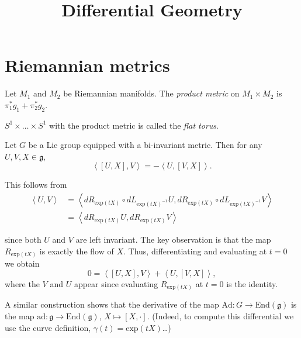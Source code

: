 



\title{Differential Geometry}
\maketitle

\label{section-phantom}
\tableofcontents

\section{Riemannian metrics}
\label{section-Riemannian-metrics}

\begin{definition}
\label{definition-product-metric}
Let $M_1$ and $M_2$ be Riemannian manifolds.
The {\it product metric} on
$M_1\times M_2$ is $\pi_1^*g_1+\pi_2^*g_2$.
\end{definition}

\begin{definition}
\label{definition-flat-torus}
$S^1\times\ldots\times S^1$ with the product
metric is called the {\it flat
torus}.
\end{definition}

\medskip\noindent
Let $G$ be a Lie group equipped with a
bi-invariant metric.
Then for any $U,V,X \in \mathfrak{g}$,
\begin{equation}
\label{equation-lie-group-bi-invar-metri}
\left\langle{}[U,X],V\right\rangle{}=-\left\langle{}U,[V,X]\right\rangle{}.
\end{equation}

\noindent
This follows from
$$
\begin{aligned}
\left\langle{}U,V\right\rangle{}&=
\left\langle{}dR_{\text{exp}(tX)}\circ
dL_{\text{exp}(tX)^{-1}}U,
dR_{\text{exp}(tX)}\circ
dL_{\text{exp}(tX)^{-1}}V\right\rangle{}\\
&=\left\langle{}dR_{\text{exp}(tX)}U,
dR_{\text{exp}(tX)}V\right\rangle{}
\end{aligned}
$$

\noindent
since both $U$ and $V$ are left invariant.
The key observation is that the map
$R_{\text{exp}(tX)}$
is exactly the flow of $X$.
Thus, differentiating and evaluating at $t=0$
we obtain
$$
0=\left\langle{}[U,X],V\right\rangle{}+\left\langle{}U,[V,X]\right\rangle{},
$$
where the $V$ and $U$ appear since evaluating
$R_{\text{exp}(tX)}$ at $t=0$ is the
identity.

A similar construction shows that the
derivative of the map
$\text{Ad}:G \to \text{End}(\mathfrak{g})$
is the map $\text{ad}:\mathfrak{g} \to
\text{End}(\mathfrak{g})$,
$X \mapsto [X,\cdot]$.
(Indeed, to compute this differential we use
the curve definition,
$\gamma(t)=\text{exp}(tX)$…)

